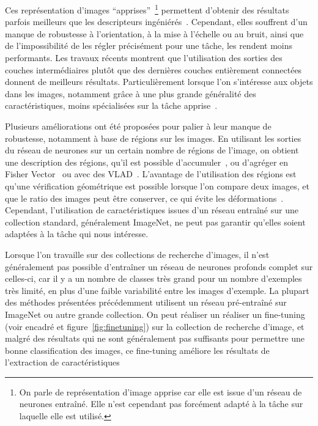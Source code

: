 Ces représentation d'images ``apprises''~\footnote{On parle de représentation d'image apprise car elle est issue d'un réseau de neurones entraîné. Elle n'est cependant pas forcément adapté à la tâche sur laquelle elle est utilisé.} permettent d'obtenir des résultats parfois meilleurs que les descripteurs ingéniérés~\cite{sharif2014cnn}.
Cependant, elles souffrent d'un manque de robustesse à l'orientation, à la mise à l'échelle ou au bruit, ainsi que de l'impossibilité de les régler précisément pour une tâche, les rendent moins performants.
Les travaux récents montrent que l'utilisation des sorties des couches intermédiaires plutôt que des dernières couches entièrement connectées donnent de meilleurs résultats. Particulièrement lorsque l'on s'intéresse aux objets dans les images, notamment grâce à une plus grande généralité des caractéristiques, moins spécialisées sur la tâche apprise~\cite{donahue2014decaf, azizpour2015generic}.

Plusieurs améliorations ont été proposées pour palier à leur manque de robustesse, notamment à base de régions sur les images.
En utilisant les sorties du réseau de neurones sur un certain nombre de régions de l'image, on obtient une description des régions, qu'il est possible d'accumuler~\cite{babenko2015aggregating, sharif2015baseline, kalantidis2016cross, tolias2015particular}, ou d’agréger en Fisher Vector~\cite{perronnin2015fisher} ou avec des VLAD~\cite{gong2014multi, paulin2015local}.
L'avantage de l'utilisation des régions est qu'une vérification géométrique est possible lorsque l'on compare deux images, et que le ratio des images peut être conserver, ce qui évite les déformations~\cite{tolias2015particular, gordo2016deep}.
Cependant, l'utilisation de caractéristiques issues d'un réseau entraîné sur une collection standard, généralement ImageNet, ne peut pas garantir qu'elles soient adaptées à la tâche qui nous intéresse.

Lorsque l'on travaille sur des collections de recherche d'images, il n'est généralement pas possible d'entraîner un réseau de neurones profonds complet sur celles-ci, car il y a un nombre de classes très grand pour un nombre d'exemples très limité, en plus d'une faible variabilité entre les images d'exemple.
La plupart des méthodes présentées précédemment utilisent un réseau pré-entraîné sur ImageNet ou autre grande collection.
On peut réaliser un réaliser un fine-tuning (voir encadré et figure~\ref{fig:finetuning}) sur la collection de recherche d'image, et malgré des résultats qui ne sont généralement pas suffisants pour permettre une bonne classification des images, ce fine-tuning améliore les résultats de l'extraction de caractéristiques~\cite{babenko2014neural, gordo2016deep, radenovic2016cnn}

